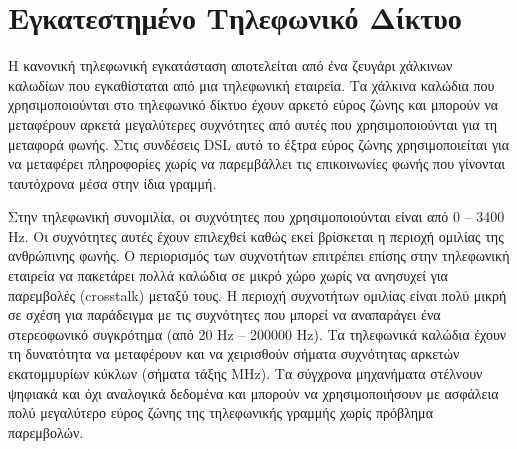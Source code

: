 %
%
\setcounter{section}{0}
\section{Εγκατεστημένο Τηλεφωνικό Δίκτυο}

Η κανονική τηλεφωνική εγκατάσταση αποτελείται από ένα ζευγάρι χάλκινων καλωδίων που εγκαθίσταται από μια τηλεφωνική εταιρεία. Τα χάλκινα καλώδια που χρησιμοποιούνται στο τηλεφωνικό δίκτυο έχουν αρκετό εύρος ζώνης και μπορούν να μεταφέρουν αρκετά μεγαλύτερες συχνότητες από αυτές που χρησιμοποιούνται για τη μεταφορά φωνής. Στις συνδέσεις DSL αυτό το έξτρα εύρος ζώνης χρησιμοποιείται για να μεταφέρει πληροφορίες χωρίς να παρεμβάλλει τις επικοινωνίες φωνής που γίνονται ταυτόχρονα μέσα στην ίδια γραμμή.

Στην τηλεφωνική συνομιλία, οι συχνότητες που χρησιμοποιούνται είναι από 0 -- 3400 Hz. Οι συχνότητες αυτές έχουν επιλεχθεί καθώς εκεί βρίσκεται η περιοχή ομιλίας της ανθρώπινης φωνής. O περιορισμός των συχνοτήτων επιτρέπει επίσης στην τηλεφωνική εταιρεία να πακετάρει πολλά καλώδια σε μικρό χώρο χωρίς να ανησυχεί για παρεμβολές (crosstalk) μεταξύ τους. Η περιοχή συχνοτήτων ομιλίας είναι πολύ μικρή σε σχέση για παράδειγμα με τις συχνότητες που μπορεί να αναπαράγει ένα στερεοφωνικό συγκρότημα (από 20 Hz -- 200000 Hz).  Τα τηλεφωνικά καλώδια έχουν τη δυνατότητα να μεταφέρουν και να χειρισθούν σήματα συχνότητας αρκετών εκατομμυρίων κύκλων (σήματα τάξης MHz).  Τα σύγχρονα μηχανήματα στέλνουν ψηφιακά και όχι αναλογικά δεδομένα και μπορούν να χρησιμοποιήσουν με ασφάλεια πολύ μεγαλύτερο εύρος ζώνης της τηλεφωνικής γραμμής χωρίς πρόβλημα παρεμβολών.
